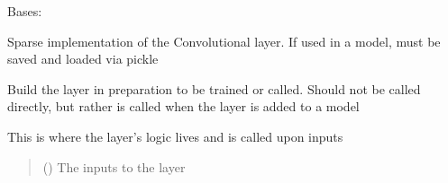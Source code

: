 \documentclass[letterpaper,10pt,english]{sphinxmanual}
\begin{document}
\begin{fulllineitems}
\label{\detokenize{beyondml.tflow.layers:beyondml.tflow.layers.SparseConv3D.SparseConv3D}}
\pysigstartsignatures
{}
\pysigstopsignatures
\sphinxAtStartPar
Bases: 

\sphinxAtStartPar
Sparse implementation of the Convolutional layer. If used in a model,
must be saved and loaded via pickle

\begin{fulllineitems}
\label{\detokenize{beyondml.tflow.layers:beyondml.tflow.layers.SparseConv3D.SparseConv3D.build}}
\pysigstartsignatures
{}
\pysigstopsignatures
\sphinxAtStartPar
Build the layer in preparation to be trained or called. Should not be called directly,
but rather is called when the layer is added to a model

\end{fulllineitems}


\begin{fulllineitems}
\label{\detokenize{beyondml.tflow.layers:beyondml.tflow.layers.SparseConv3D.SparseConv3D.call}}
\pysigstartsignatures
{}
\pysigstopsignatures
\sphinxAtStartPar
This is where the layer’s logic lives and is called upon inputs
\begin{quote}\begin{description}
\sphinxAtStartPar
{} () \textendash{} The inputs to the layer


\end{description}
\end{quote}
\end{fulllineitems}
\end{fulllineitems}
\end{document}
